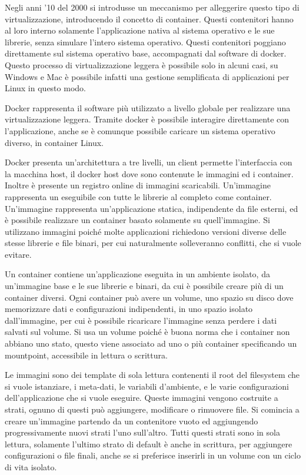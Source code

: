 \documentclass{article}
\numberwithin{equation}{subsection}
\begin{document}
Negli anni '10 del 2000 si introdusse un meccanismo per alleggerire questo tipo di virtualizzazione, introducendo il concetto di container. Questi contenitori hanno al loro interno solamente l'applicazione nativa 
al sistema operativo e le sue librerie, senza simulare l'intero sistema operativo. Questi contenitori poggiano direttamente sul sistema operativo base, accompagnati dal software di docker. Questo processo di 
virtualizzazione leggera è possibile solo in alcuni casi, su Windows e Mac è possibile infatti una gestione semplificata di applicazioni per Linux in questo modo. 


Docker rappresenta il software più utilizzato a livello globale per realizzare una virtualizzazione leggera. Tramite docker è possibile interagire direttamente con l'applicazione, anche se è comunque possibile 
caricare un sistema operativo diverso, in container Linux. 


Docker presenta un'architettura a tre livelli, un client permette l'interfaccia con la macchina host, il docker host dove sono contenute le immagini ed i container. Inoltre è presente un registro online di 
immagini scaricabili. Un'immagine rappresenta un eseguibile con tutte le librerie al completo come container. Un'immagine rappresenta un'applicazione statica, indipendente da file esterni, ed è possibile realizzare 
un container basato solamente su quell'immagine. Si utilizzano immagini poiché molte applicazioni richiedono versioni diverse delle stesse librerie e file binari, per cui naturalmente solleveranno conflitti, che si 
vuole evitare. 

Un container contiene un'applicazione eseguita in un ambiente isolato, da un'immagine base e le sue librerie e binari, da cui è possibile creare più di un container diversi. Ogni container può avere un volume, 
uno spazio su disco dove memorizzare dati e configurazioni indipendenti, in uno spazio isolato dall'immagine, per cui è possibile ricaricare l'immagine senza perdere i dati salvati sul volume. 
Si usa un volume poiché è buona norma che i container non abbiano uno stato, questo viene associato ad uno o più container specificando un mountpoint, accessibile in lettura o scrittura. 

Le immagini sono dei template di sola lettura contenenti il root del filesystem che si vuole istanziare, i meta-dati, le variabili d'ambiente, e le varie configurazioni dell'applicazione che si vuole eseguire. 
Queste immagini vengono costruite a strati, ognuno di questi può aggiungere, modificare o rimuovere file. Si comincia a creare un'immagine partendo da un contenitore vuoto ed aggiungendo progressivamente nuovi strati 
l'uno sull'altro. Tutti questi strati sono in sola lettura, solamente l'ultimo strato di default è anche in scrittura, per aggiungere configurazioni o file finali, anche se si preferisce inserirli in un volume 
con un ciclo di vita isolato. 
\end{document}
